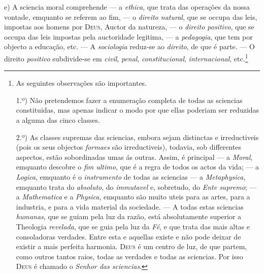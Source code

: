 e) A sciencia moral comprehende --- a \emph{ethica}, que trata das operações da nossa vontade, emquanto se referem ao fim, --- o \emph{direito natural}, que se occupa das leis, impostas aos homens por \textsc{Deus}, Auctor da natureza, --- o \emph{direito positivo}, que se occupa das leis impostas pela auctoridade legitima, --- a \emph{pedagogia}, que tem por objecto a educação, etc. --- A \emph{sociologia} reduz-se ao \emph{direito}, de que é parte. --- O direito \emph{positivo} subdivide-se em \emph{civil}, \emph{penal}, \emph{constitucional}, \emph{internacional}, etc.\footnote{As seguintes observações são importantes.\par 1.º) Não pretendemos fazer a enumeração completa de todas as sciencias constituidas, mas apenas indicar o modo por que ellas poderiam ser reduzidas a alguma das cinco classes.\par 2.º) As classes supremas das sciencias, embora sejam distinctas e irreductiveis (pois os seus objectos \emph{formaes} são irreductiveis), todavia, sob differentes aspectos, estão sobordinadas umas ás outras. Assim, é principal --- a \emph{Moral}, emquanto descobre o \emph{fim ultimo}, que é a regra de todos os actos da vida; --- a \emph{Logica}, emquanto é o \emph{instrumento} de todas as sciencias --- a \emph{Metaphysica}, emquanto trata do \emph{absoluto}, do \emph{immutavel} e, sobretudo, do \emph{Ente supremo}; --- a \emph{Mathematica} e a \emph{Physica}, emquanto são muito uteis para as artes, para a industria, e para a vida material da sociedade. --- A todas estas sciencias \emph{humanas}, que se guiam pela luz da razão, está absolutamente superior a Theologia \emph{revelada}, que se guia pela luz da \emph{Fé}, e que trata das mais altas e consoladoras verdades. Entre esta e aquellas existe e não pode deixar de existir a mais perfeita harmonia. \textsc{Deus} é um centro de luz, de que partem, como outros tantos raios, todas as verdades e todas as sciencias. Por isso \textsc{Deus} é chamado o \emph{Senhor das sciencias}.}

    
